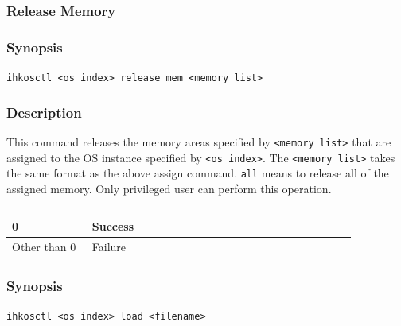 \documentclass[twoside,11pt,fleqn]{book}
\begin{document}
\subsubsection{Release Memory}
\subsubsection*{Synopsis}{\quad} \texttt{ihkosctl <os index> release mem <memory list>}
\subsubsection*{Description}{\quad}
This command releases the memory areas specified by \texttt{<memory list>} that are assigned to the OS instance specified by \texttt{<os index>}.
The \texttt{<memory list>} takes the same format as the above assign command. \texttt{all} means to release all of the assigned memory.
Only privileged user can perform this operation.

\subsubsection*{}
\begin{table}[!h]
\footnotesize
\begin{tabular}{|p{0.20\linewidth}|p{0.66\linewidth}|} \hline
0&Success\\ \hline
Other than 0&Failure\\ \hline
\end{tabular}
\vspace{-0em}
\end{table}
\FloatBarrier

\subsubsection{}
\subsubsection*{Synopsis}{\quad} \texttt{ihkosctl <os index> load <filename>}
\end{document}
